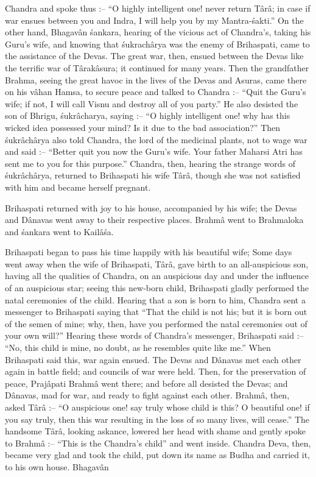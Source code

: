 Chandra and spoke thus :-- ``O highly intelligent one! never return T\^ar\^a; in case if war ensues between you and Indra, I will help you by my Mantra-\'sakti.'' On the other hand, Bhagav\^an \'sankara, hearing of the vicious act of Chandra's, taking his Guru's wife, and knowing that \'sukrach\^arya was the enemy of Brihaspati, came to the assistance of the Devas. The great war, then, ensued between the Devas like the terrific war of T\^arak\^asura; it continued for many years. Then the grandfather Brahma, seeing the great havoc in the lives of the Devas and Asuras, came there on his v\^ahan Hamsa, to secure peace and talked to Chandra :-- ``Quit the Guru's wife; if not, I will call Visnu and destroy all of you party.'' He also desisted the son of Bhrigu, \'sukr\^acharya,  saying :-- ``O highly intelligent one! why has this wicked idea possessed your mind? Is it due to the bad association?'' Then \'sukr\^ach\^arya also told Chandra, the lord of the medicinal plants, not to wage war and said :-- ``Better quit you now the Guru's wife. Your father Maharsi Atri has sent me to you for this purpose.'' Chandra, then, hearing the strange words of \'sukr\^ach\^arya, returned to Brihaspati his wife T\^ar\^a, though she was not satisfied with him and became herself pregnant.

Brihaspati returned with joy to his house, accompanied by his wife; the Devas and D\^anavas went away to their respective places. Brahm\^a went to Brahmaloka and \'sankara went to Kail\^a\'sa.

Brihaspati began to pass his time happily with his beautiful wife; Some days went away when the wife of Brihaspati, T\^ar\^a, gave birth to an all-auspicious son, having all the qualities of Chandra, on an auspicious day and under the influence of an auspicious star; seeing this new-born child, Brihaspati gladly performed the natal ceremonies of the child. Hearing that a son is born to him, Chandra sent a messenger to Brihaspati saying that ``That the child is not his; but it is born out of the semen of mine; why, then, have you performed the natal ceremonies out of your own will?'' Hearing these words of Chandra's messenger, Brihaspati said :-- ``No, this child is mine, no doubt, as he resembles quite like me.'' When Brihaspati said this, war again ensued. The Devas and D\^anavas met each other again in battle field; and councils of war were held. Then, for the preservation of peace, Praj\^apati Brahm\^a went there; and before all desisted the Devas; and D\^anavas, mad for war, and ready to fight against each other. Brahm\^a, then, asked T\^ar\^a :-- ``O auspicious one! say truly whose child is this? O beautiful one! if you say truly, then this war resulting in the loss of so many lives, will cease.'' The handsome T\^ar\^a, looking askance, lowered her head with shame and gently spoke to Brahm\^a :-- ``This is the Chandra's child'' and went inside. Chandra Deva, then, became very glad and took the child, put down its name as Budha and carried it, to his own house. Bhagav\^an


